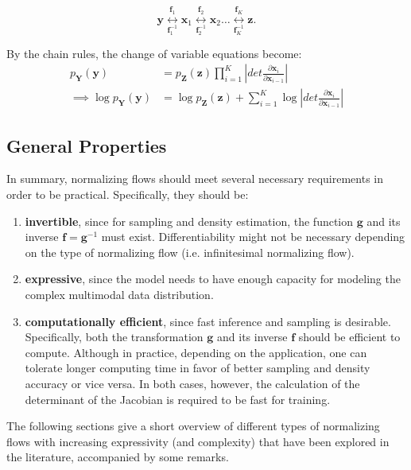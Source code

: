 $$
\mathbf{y}
\underset{\mathbf{f}^{-1}_1}{\overset{\mathbf{f}_1}{\longleftrightarrow}}
\mathbf{x}_1
\underset{\mathbf{f}^{-1}_2}{\overset{\mathbf{f}_2}{\longleftrightarrow}}
\mathbf{x}_2 \ldots
\underset{\mathbf{f}^{-1}_K}{\overset{\mathbf{f}_K}{\longleftrightarrow}}
\mathbf{z}
.$$

By the chain rules, the change of variable equations become:
\begin{align}
  p_{\mathbf{Y}}(\mathbf{y}) &= p_{\mathbf{Z}}(\mathbf{z}) \prod_{i=1}^K \left|det
   \frac{\partial \mathbf{x}_i}{\partial \mathbf{x}_{i-1} } \right| \\
\implies
  \log p_{\mathbf{Y}}(\mathbf{y}) &= \log p_{\mathbf{Z}}(\mathbf{z}) +  \sum_{i=1}^K
  \log \left|det
   \frac{\partial \mathbf{x}_i}{\partial \mathbf{x}_{i-1} } \right|
\end{align}

\subsection{General Properties}

In summary, normalizing flows should meet several necessary requirements in
order to be practical. Specifically, they should be:
\begin{enumerate}
  \item \textbf{invertible}, since for sampling and density estimation, the function
    $\mathbf{g}$ and its inverse $\mathbf{f} = \mathbf{g}^{-1}$ must exist.
    Differentiability might not be necessary depending on the type of
    normalizing flow (i.e. infinitesimal normalizing flow).
  \item \textbf{expressive}, since the model needs to have enough capacity for modeling the complex multimodal data distribution.
  \item \textbf{computationally efficient}, since fast inference and sampling is
    desirable. Specifically, both the transformation $\mathbf{g}$ and its
    inverse $\mathbf{f}$ should be efficient to compute. Although in practice,
    depending on the application, one can tolerate longer computing time in
    favor of better sampling and density accuracy or vice versa. In both cases,
    however, the calculation of the determinant of the Jacobian is required to
    be fast for training.
\end{enumerate}

The following sections give a short overview of different types of normalizing
flows with increasing expressivity (and complexity) that have been explored in
the literature, accompanied by some remarks.

